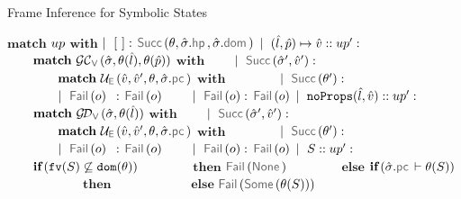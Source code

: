 \begin{algorithm}
\caption{Frame Inference for Symbolic States}\label{fip:symb:states}
\begin{algorithmic}[1]
    \State $\textbf{match}$ $up$ $\textbf{with}$
    \State $\mid~[ \ ]:$ \Return $\success{\subst, \sstate.\hpsel, \sstate.\domsel}$
    \State $\mid~(\hat{l}, \hat{p}) \mapsto \hat{v} :: up' :$ 
    \State $\qquad \textbf{match} \ \GetCellV{\sstate, \subst(\sloc), \subst(\sexprp)}$ $\textbf{with}$
    \State $\qquad \mid~\success{\sstate', \sexprv'}:$
    \State $\qquad \qquad \textbf{match} \ \unifylexpr(\sexprv, \sexprv', \subst, \sstate.\pcsel)$ $\textbf{with}$
     \State $\qquad \qquad \mid~ \success{\subst'}:$ \Return {}
      \State $\qquad \qquad \mid~ \fail{\option} \ \, :$ \Return $\fail{\option}$
      \State $\qquad \mid~\fail{\option}:$ \Return $\fail{\option}$
     \State $\mid~\texttt{noProps}(\hat{l}, \hat{v}) :: up' :$  
       \State $\qquad \textbf{match} \ \GetDomainV{\sstate, \subst(\sloc)}$ $\textbf{with}$
       \State $\qquad \mid~\success{\sstate', \sexprv'}:$
         \State $\qquad \qquad \textbf{match} \ \unifylexpr(\sexprv, \sexprv', \subst, \sstate.\pcsel)$ $\textbf{with}$
       \State $\qquad \qquad \mid~ \success{\subst'}:$ \Return {}
       \State $\qquad \qquad \mid~ \fail{\option} \ \, :$ \Return $\fail{\option}$
       \State $\qquad \mid~\fail{\option}:$ \Return $\fail{\option}$
     \State $\mid~S :: up' :$   
      \State $\qquad \textbf{if} \, (\texttt{fv}(S) \not\subseteq \texttt{dom}(\theta))$
      \State $\qquad \qquad \textbf{then}$ \Return $\fail{\onone}$
      \State $\qquad \qquad \textbf{else}$ $\textbf{if} \,(\sstate.\pcsel \vdash \subst(\sass))$
       \State $\qquad \qquad \qquad \textbf{then}$ \Return  {}
      \State $\qquad \qquad \qquad \textbf{else}$  \Return $\fail{\osome{\subst(\sass)}}$
\EndFunction
\end{algorithmic}
\end{algorithm}




